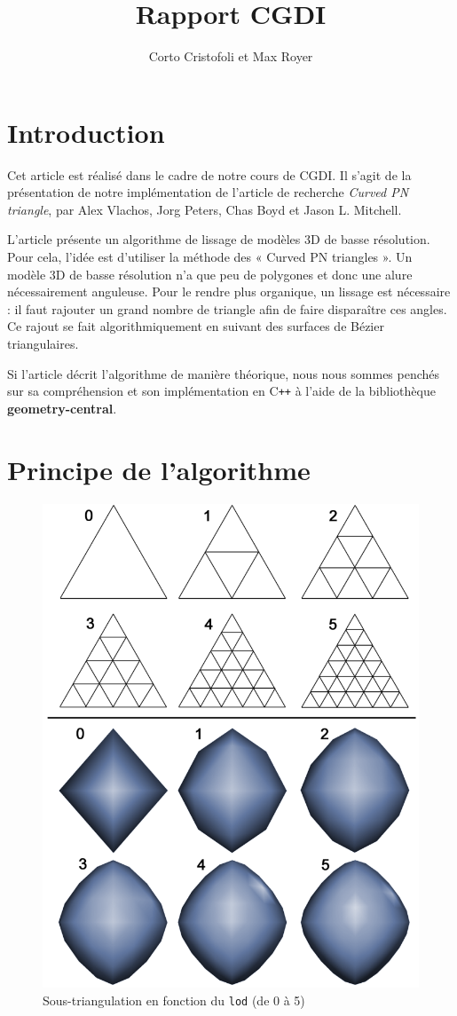 \documentclass{article}
\title{Rapport CGDI}
\author{Corto Cristofoli et Max Royer}
\def\Cpp{C\texttt{++} }
\begin{document}
\maketitle



\section{Introduction}
Cet article est réalisé dans le cadre de notre cours de CGDI.
Il s'agit de la présentation de notre implémentation de l'article
de recherche \textit{Curved PN triangle}, par Alex Vlachos, Jorg Peters,
Chas Boyd et Jason L. Mitchell.

L'article présente un algorithme de lissage de modèles 3D de basse résolution.
Pour cela, l'idée est d'utiliser la méthode des « Curved PN triangles ». Un
modèle 3D de basse résolution n'a que peu de polygones et donc une alure
nécessairement anguleuse. Pour le rendre plus organique, un lissage est
nécessaire : il faut rajouter un grand nombre de triangle afin de faire
disparaître ces angles. Ce rajout se fait algorithmiquement en suivant des
surfaces de Bézier triangulaires.

Si l'article décrit l'algorithme de manière théorique, nous nous sommes penchés
sur sa compréhension et son implémentation en \Cpp à l'aide de la
bibliothèque \textbf{geometry-central}.


\section{Principe de l'algorithme}

\begin{figure}[ht!]
\centering
    \includegraphics[width=0.4\linewidth]{lod}
    \caption{Sous-triangulation en fonction du \texttt{lod} (de 0 à 5)}
    \label{fig:lod}
\end{figure}
\end{document}
